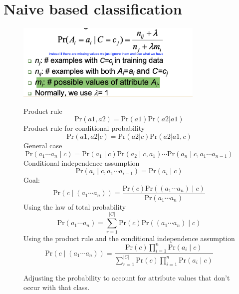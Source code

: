 \documentclass[10pt,oneside,a4paper]{article}
\begin{document}
\section{Naive based classification}
\begin{figure}[H]
    \centering
    \begin{minipage}{0.5\textwidth}
        \centering
        \includegraphics[width=0.8\textwidth]{Images/Zerocounts.png}
    \end{minipage}%
    \hfill %
    \begin{minipage}{0.5\textwidth}
        Product rule
        \[
            \text{Pr}(a1, a2) = \text{Pr}(a1) \text{Pr}(a2 | a1)
        \]
        Product rule for conditional probability
        \[
            \text{Pr}(a1, a2|c) = \text{Pr}(a2|c) \text{Pr}(a2 | a1, c)
        \]
        General case
        \[
            \text{Pr}(a_1 \cdots a_n \mid c) = \text{Pr}(a_1 \mid c) \text{Pr}(a_2 \mid c, a_1) \cdots \text{Pr}(a_n \mid c, a_1 \cdots a_{n-1})
        \]
        Conditional independence assumption
        \[
            \text{Pr}(a_i \mid c, a_1 \cdots a_{i-1}) = \text{Pr}(a_i \mid c)
        \]
        Goal:
        \[
            \text{Pr}(c \mid (a_1 \cdots a_n)) = \frac{\text{Pr}(c)  \text{Pr}((a_1 \cdots a_n) \mid c)}{\text{Pr}(a_1 \cdots a_n)}
        \]
        Using the law of total probability
        \[
            \text{Pr}(a_1 \cdots a_n) = \sum_{r=1}^{|C|} \text{Pr}(c) \text{Pr}((a_1  \cdots a_n) \mid c)
        \]
        Using the product rule and the conditional independence assumption
        \[
            \text{Pr}(c \mid (a_1 \cdots a_n)) = \frac{\text{Pr}(c) \prod_{i=1}^{n} \text{Pr}(a_i \mid c)}{\sum_{r=1}^{|C|} \text{Pr}(c) \prod_{i=1}^{n} \text{Pr}(a_i \mid c)}
        \]

        Adjusting the probability to account for attribute values that don't occur with that class.

    \end{minipage}
\end{figure}
\end{document}
